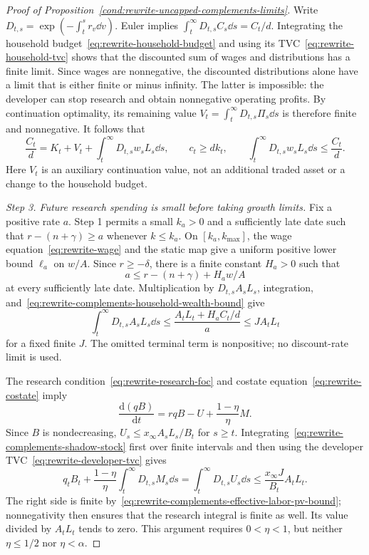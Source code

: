 \begin{proof}[Proof of Proposition~\ref{cond:rewrite-uncapped-complements-limits}]
Write $D_{t,s}=\exp(-\int_t^s r_v\dd v)$.
Euler implies $\int_t^\infty D_{t,s}C_s\dd s=C_t/d$.
Integrating the household budget~\eqref{eq:rewrite-household-budget}
and using its TVC~\eqref{eq:rewrite-household-tvc} shows that
the discounted sum of wages and distributions has a finite limit.
Since wages are nonnegative, the discounted distributions alone have
a limit that is either finite or minus infinity. The latter is impossible:
the developer can stop research and obtain nonnegative operating profits.
By continuation optimality, its remaining value
$V_t=\int_t^\infty D_{t,s}\Pi_s\dd s$ is therefore finite and nonnegative.
It follows that
\begin{equation}
 \frac{C_t}{d}
 =K_t+V_t+\int_t^\infty D_{t,s}w_sL_s\dd s,\qquad
 c_t\geq dk_t,\qquad
 \int_t^\infty D_{t,s}w_sL_s\dd s\leq\frac{C_t}{d}.
 \label{eq:rewrite-complements-household-wealth-bound}
\end{equation}
Here $V_t$ is an auxiliary continuation value, not an additional traded
asset or a change to the household budget.

\textit{Step 3. Future research spending is small before taking growth limits.}
Fix a positive rate $a$. Step 1 permits a small $k_a>0$ and a sufficiently
late date such that $r-(n+\gamma)\geq a$ whenever $k\leq k_a$.
On $[k_a,k_{\max}]$, the wage equation~\eqref{eq:rewrite-wage} and the
static map give a uniform positive lower bound $\ell_a$ on $w/A$.
Since $r\geq-\delta$, there is a finite constant $H_a>0$ such that
\[
 a\leq r-(n+\gamma)+H_a w/A
\]
at every sufficiently late date. Multiplication by $D_{t,s}A_sL_s$,
integration, and~\eqref{eq:rewrite-complements-household-wealth-bound} give
\begin{equation}
 \int_t^\infty D_{t,s}A_sL_s\dd s
 \leq\frac{A_tL_t+H_aC_t/d}{a}
 \leq J A_tL_t
 \label{eq:rewrite-complements-effective-labor-pv-bound}
\end{equation}
for a fixed finite $J$. The omitted terminal term is nonpositive;
no discount-rate limit is used.

The research condition~\eqref{eq:rewrite-research-foc} and costate
equation~\eqref{eq:rewrite-costate} imply
\begin{equation}
 \frac{\mathrm d(qB)}{\mathrm dt}
 =rqB-U+\frac{1-\eta}{\eta}M.
 \label{eq:rewrite-complements-shadow-stock}
\end{equation}
Since $B$ is nondecreasing, $U_s\leq x_\infty A_sL_s/B_t$ for $s\geq t$.
Integrating~\eqref{eq:rewrite-complements-shadow-stock} first over finite
intervals and then using the developer TVC~\eqref{eq:rewrite-developer-tvc} gives
\begin{equation}
 q_tB_t+\frac{1-\eta}{\eta}
       \int_t^\infty D_{t,s}M_s\dd s
 =\int_t^\infty D_{t,s}U_s\dd s
 \leq\frac{x_\infty J}{B_t}A_tL_t.
 \label{eq:rewrite-complements-research-pv-bound}
\end{equation}
The right side is finite by~\eqref{eq:rewrite-complements-effective-labor-pv-bound};
nonnegativity then ensures that the research integral is finite as well.
Its value divided by $A_tL_t$ tends to zero. This argument requires
$0<\eta<1$, but neither $\eta\leq1/2$ nor $\eta<\alpha$.


\end{proof}
